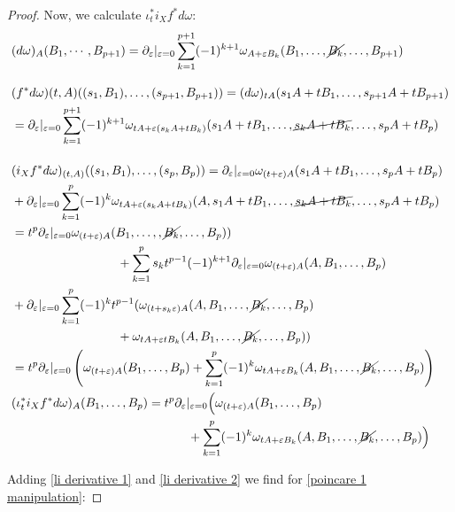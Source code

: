 \documentclass[b5paper,draft,openbib,12pt]{memoir}
\begin{document}
\begin{proof}
Now, we calculate \(\iota^*_t i_X f^* d \omega\):
\begin{align}
&(d\omega)_A(B_1,\cdots, B_{p+1})=\partial_\varepsilon |_{\varepsilon=0} \sum_{k=1}^{p+1} (-1)^{k+1} \omega_{A+\varepsilon B_k}(B_1,\dots , \cancel{B_k}, \dots, B_{p+1})\\[0.3cm]
&(f^* d \omega){(t,A)}((s_1,B_1),\dots , (s_{p+1},B_{p+1}))= (d\omega)_{tA}(s_1A + t B_1, \dots, s_{p+1}A+t B_{p+1})\\
&=\partial_{\varepsilon}|_{\varepsilon =0} \sum_{k=1}^{p+1}(-1)^{k+1} \omega_{tA + \varepsilon(s_kA + t B_k)}(s_1A+tB_1, \dots,  \cancel{s_k A + t B_k},\dots , s_p A  + t B_p )\\[0.4cm]
&(i_X f^* d \omega)_{(t,A)}((s_1,B_1),\dots , (s_p, B_p))= \partial_{\varepsilon} |_{\varepsilon =0} \omega_{(t+\varepsilon)A}(s_1A+tB_1, \dots, s_pA+t B_p)\\
&+\partial_{\varepsilon}|_{\varepsilon=0} \sum_{k=1}^p (-1)^k \omega_{tA + \varepsilon(s_k A + t B_k)} (A,s_1A+t B_1, \dots, \cancel{s_k A + t B_k},\dots, s_p A + t B_p)\\
&= t^p \partial_{\varepsilon}|_{\varepsilon=0}\omega_{(t+\varepsilon)A }(B_1,\dots, ,\cancel{B_k},\dots, B_p))\\
&\hspace{3cm}+ \sum_{k=1}^p s_k t^{p-1} (-1)^{k+1} \partial_{\varepsilon}|_{\varepsilon=0}\omega_{(t+\varepsilon)A}(A,B_1,\dots, B_p) \\
&+\partial_{\varepsilon}|_{\varepsilon=0}\sum_{k=1}^p(-1)^k t^{p-1}(\omega_{(t+s_k\varepsilon)A}(A,B_1,\dots, \cancel{B_k},\dots, B_p) \\
&\hspace{3cm} + \omega_{tA + \varepsilon t B_k}(A,B_1, \dots, \cancel{B_k},\dots, B_p))\\
&=t^p\partial_{\varepsilon}|_{\varepsilon=0} \left(\omega_{(t+\varepsilon)A}(B_1,\dots, B_p) +\sum_{k=1}^p (-1)^k \omega_{tA+\varepsilon B_k}(A,B_1,\dots, \cancel{B_k},\dots, B_p)\right)\\
&(\iota_t^* i_X f^* d \omega)_{A}(B_1,\dots ,  B_p)=t^p\partial_{\varepsilon}|_{\varepsilon=0} \Big(\omega_{(t+\varepsilon)A}(B_1,\dots, B_p)\\\label{li derivative 2}
&\hspace{5cm}+\sum_{k=1}^p (-1)^k \omega_{tA+\varepsilon B_k}(A,B_1,\dots, \cancel{B_k},\dots, B_p)\Big)
\end{align}

Adding \eqref{li derivative 1} and \eqref{li derivative 2} we find for \eqref{poincare 1 manipulation}:


\end{proof}
\end{document}

